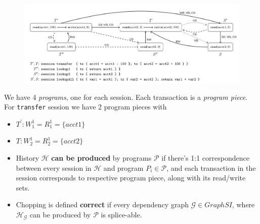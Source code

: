 \documentclass{beamer}
\begin{document}
\begin{frame}
	\begin{figure}
		\includegraphics[scale=0.28]{fig4}
	\end{figure}
	\begin{example}
		We have 4 \textit{programs}, one for each session. Each transaction is a \textit{program piece}. \\
		For \texttt{transfer} session we have 2 program pieces with
		\begin{itemize}
			\item $T^\prime: W^1_1 = R^1_1 = \{acct1\}$
			\item $T: W^1_2 = R^1_2 = \{acct2\}$
		\end{itemize}
	\end{example}
\end{frame}

\begin{frame}
	\begin{itemize}
		\item History $\mathcal{H}$ \textbf{can be produced} by programs $\mathcal{P}$ if there's 1:1 correspondence between every session in $\mathcal{H}$ and program $P_i\in\mathcal{P}$, and each transaction in the session corresponds to respective program piece, along with its read/write sets.
		\item Chopping is defined \textbf{correct} if every dependency graph $\mathcal{G}\in GraphSI$, where $\mathcal{H}_\mathcal{G}$ can be produced by $\mathcal{P}$ is splice-able.
	\end{itemize}
\end{frame}
\end{document}
